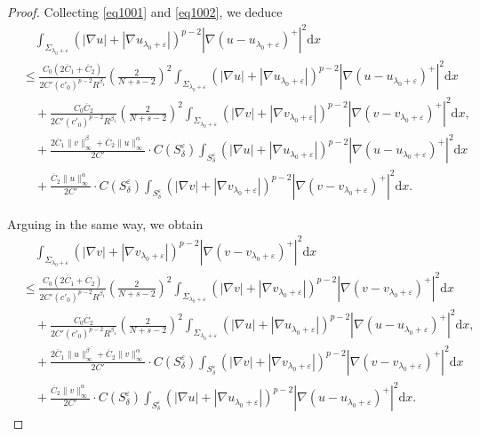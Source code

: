 \documentclass[12pt]{amsart}
\theoremstyle{definition}
\theoremstyle{remark}
\theoremstyle{conclusion}
\theoremstyle{conjecture}
\numberwithin{equation}{section}
\begin{document}
\begin{proof}
Collecting \eqref{eq1001} and \eqref{eq1002}, we deduce
\begin{align}\label{eq1003}
&\quad \int_{\Sigma_{\lambda_0+\varepsilon}} (|\nabla u|+|\nabla u_{\lambda_0+\varepsilon}|)^{p-2} |\nabla(u-u_{\lambda_0+\varepsilon})^+|^2 \mathrm{d}x \\
&\leq \frac{C_0(2\overline{C}_1+\overline{C}_2)}{2C'(c'_0)^{p-2}R^{\beta_1}} \left( \frac{2}{N+s-2} \right)^2 \int_{\Sigma_{\lambda_0 + \varepsilon}}\left(|\nabla u| +|\nabla u_{\lambda_0+\varepsilon}|\right)^{p-2} |\nabla(u-u_{\lambda_0+\varepsilon})^+|^2 \mathrm{d}x \nonumber\\
&\quad +\frac{C_0 \overline{C}_2}{2C'(c'_0)^{p-2}R^{\beta_1}} \left( \frac{2}{N+s-2} \right)^2  \int_{\Sigma_{\lambda_0 + \varepsilon}}  (|\nabla v|+|\nabla v_{\lambda_0+\varepsilon}|)^{p-2} |\nabla(v-v_{\lambda_0+\varepsilon})^+|^2 \mathrm{d}x,  \nonumber \\
&\quad + \frac{2\overline{C}_1\|v\|^\beta_{\infty}+\overline{C}_2\|u\|_{\infty}^\alpha}{2C'} \cdot C(S_\delta^\varepsilon) \int_{S_\delta^\varepsilon} (|\nabla u|+|\nabla u_{\lambda_0+\varepsilon}|)^{p-2} |\nabla(u-u_{\lambda_0+\varepsilon})^+|^2 \mathrm{d}x \nonumber\\
&\quad + \frac{\overline{C}_2\|u\|^\alpha_{\infty}}{2C'} \cdot C(S_\delta^\varepsilon) \int_{S_\delta^\varepsilon} (|\nabla v|+|\nabla v_{\lambda_0+\varepsilon}|)^{p-2} |\nabla(v-v_{\lambda_0+\varepsilon})^+|^2 \mathrm{d}x. \nonumber
\end{align}

Arguing in the same way, we obtain
\begin{align}\label{eq1003-}
&\quad \int_{\Sigma_{\lambda_0+\varepsilon}} (|\nabla v|+|\nabla v_{\lambda_0+\varepsilon}|)^{p-2} |\nabla(v-v_{\lambda_0+\varepsilon})^+|^2 \mathrm{d}x \\
&\leq \frac{C_0(2\overline{C}_1+\overline{C}_2)}{2C'(c'_0)^{p-2}R^{\beta_1}} \left( \frac{2}{N+s-2} \right)^2 \int_{\Sigma_{\lambda_0 + \varepsilon}}\left(|\nabla v| +|\nabla v_{\lambda_0+\varepsilon}|\right)^{p-2} |\nabla(v-v_{\lambda_0+\varepsilon})^+|^2 \mathrm{d}x \nonumber\\
&\quad +\frac{C_0 \overline{C}_2}{2C'(c'_0)^{p-2}R^{\beta_1}} \left( \frac{2}{N+s-2} \right)^2  \int_{\Sigma_{\lambda_0 + \varepsilon}}  (|\nabla u|+|\nabla u_{\lambda_0+\varepsilon}|)^{p-2} |\nabla(u-u_{\lambda_0+\varepsilon})^+|^2 \mathrm{d}x,  \nonumber \\
&\quad + \frac{2\overline{C}_1\|u\|^\beta_{\infty}+\overline{C}_2\|v\|_{\infty}^\alpha}{2C'} \cdot C(S_\delta^\varepsilon) \int_{S_\delta^\varepsilon} (|\nabla v|+|\nabla v_{\lambda_0+\varepsilon}|)^{p-2} |\nabla(v-v_{\lambda_0+\varepsilon})^+|^2 \mathrm{d}x \nonumber\\
&\quad + \frac{\overline{C}_2\|v\|^\alpha_{\infty}}{2C'} \cdot C(S_\delta^\varepsilon) \int_{S_\delta^\varepsilon} (|\nabla u|+|\nabla u_{\lambda_0+\varepsilon}|)^{p-2} |\nabla(u-u_{\lambda_0+\varepsilon})^+|^2 \mathrm{d}x. \nonumber
\end{align}


\end{proof}
\end{document}
